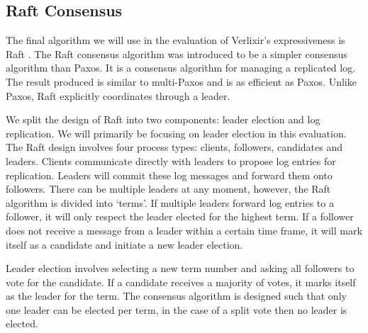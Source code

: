 \subsection{Raft Consensus} \label{sec:raft}
The final algorithm we will use in the evaluation of Verlixir's expressiveness is Raft \cite{raft}. The Raft consensus algorithm was introduced to be a simpler consensus algorithm than Paxos. It is a consensus algorithm for managing a replicated log. The result produced is similar to multi-Paxos and is as efficient as Paxos. Unlike Paxos, Raft explicitly coordinates through a leader.
\par
We split the design of Raft into two components: leader election and log replication. We will primarily be focusing on leader election in this evaluation. The Raft design involves four process types: clients, followers, candidates and leaders. Clients communicate directly with leaders to propose log entries for replication. Leaders will commit these log messages and forward them onto followers. There can be multiple leaders at any moment, however, the Raft algorithm is divided into `terms'. If multiple leaders forward log entries to a follower, it will only respect the leader elected for the highest term. If a follower does not receive a message from a leader within a certain time frame, it will mark itself as a candidate and initiate a new leader election.
\par
Leader election involves selecting a new term number and asking all followers to vote for the candidate. If a candidate receives a majority of votes, it marks itself as the leader for the term. The consensus algorithm is designed such that only one leader can be elected per term, in the case of a split vote then no leader is elected.
\par
